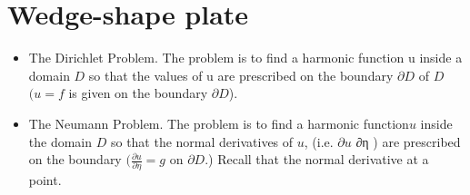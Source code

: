 \section{Wedge-shape plate}
\begin{itemize}
\item The Dirichlet Problem. The problem is to find a harmonic function u inside
a domain $D$ so that the values of u are prescribed on the boundary $\partial D$ of $D$ $(u = f$
is given on the boundary $∂D$).
\item The Neumann Problem. The problem is to find a harmonic function$ u$
inside the domain $D$ so that the normal derivatives of $u$, (i.e. $∂u$
∂η ) are prescribed
on the boundary $(\frac{\partial u}
{\partial \eta} = g$ on $\partial D$.) Recall that the normal derivative at a point.
\end{itemize}
